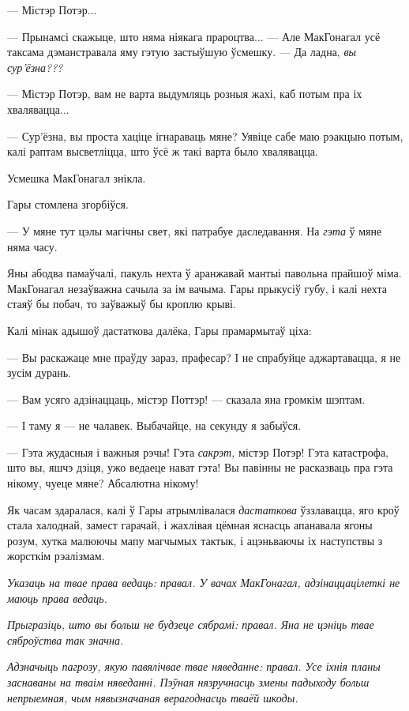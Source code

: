 --- Містэр Потэр...

--- Прынамсі скажыце, што няма ніякага прароцтва... --- Але МакГонагал усё таксама дэманстравала яму гэтую застыўшую ўсмешку. --- Да ладна, \emph{вы сур'ёзна???}

--- Містэр Потэр, вам не варта выдумляць розныя жахі, каб потым пра іх 
хвалявацца...

--- Сур'ёзна, вы проста хаціце ігнараваць мяне? Уявіце сабе маю рэакцыю потым, калі
раптам высветліцца, што ўсё ж такі варта было хвалявацца.

Усмешка МакГонагал знікла.

Гары стомлена згорбіўся.

--- У мяне тут цэлы магічны свет, які патрабуе даследавання. На \emph{гэта} ў мяне няма часу.

Яны абодва памаўчалі, пакуль нехта ў аранжавай мантыі павольна прайшоў міма.
МакГонагал незаўважна сачыла за ім вачыма. Гары прыкусіў губу, і калі нехта 
стаяў бы побач, то заўважыў бы кроплю крыві.

Калі мінак адышоў дастаткова далёка, Гары прамармытаў ціха:

--- Вы раскажаце мне праўду зараз, прафесар? І не спрабуйце аджартавацца, 
я не зусім дурань.

--- Вам усяго адзінаццаць, містэр Поттэр! --- сказала яна громкім шэптам.

--- І таму я --- не чалавек. Выбачайце, на секунду я забыўся.

--- Гэта жудасныя і важныя рэчы! Гэта \emph{сакрэт,} містэр Потэр!
Гэта катастрофа, што вы, яшчэ дзіця, ужо ведаеце нават гэта! Вы павінны не 
расказваць пра гэта нікому, чуеце мяне? Абсалютна нікому!

Як часам здаралася, калі ў Гары атрымлівалася \emph{дастаткова} ўззлавацца, яго 
кроў стала халоднай, замест гарачай, і жахлівая цёмная яснасць апанавала ягоны
розум, хутка малюючы мапу магчымых тактык, і ацэньваючы іх наступствы з
жорсткім рэалізмам.

\emph{Указаць на твае права ведаць: правал. У вачах МакГонагал, адзінаццацілеткі
не маюць права ведаць.}

\emph{Прыгразіць, што вы больш не будзеце сябрамі: правал. Яна не цэніць твае
сяброўства так значна.}

\emph{Адзначыць пагрозу, якую павялічвае твае няведанне: правал. Усе іхнія планы
заснаваны на тваім няведанні. Пэўная нязручнасць змены падыходу больш непрыемная,
чым нявызначаная верагоднасць тваёй шкоды.}

